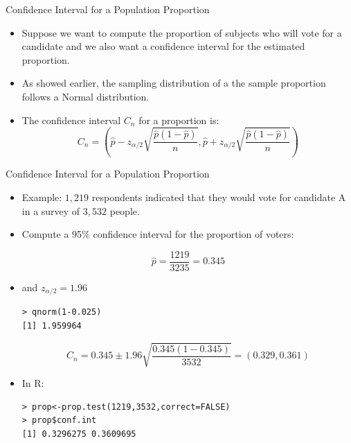 \documentclass[handout]{beamer}
\begin{document}
\begin{frame}{Confidence Interval for a Population Proportion}
\scriptsize{
\begin{itemize}
 \item Suppose we want to compute the proportion of subjects who will vote for a candidate and we also want a confidence interval for the estimated proportion.
 
 \item As showed earlier, the sampling distribution of a the sample proportion follows a Normal distribution.

 \item The confidence interval $C_n$ for a proportion is:
\begin{displaymath}
 C_n = \left(\hat{p}-z_{\alpha/2}\sqrt{\frac{\hat{p}(1-\hat p)}{n}} , \hat{p} + z_{\alpha/2}\sqrt{\frac{\hat{p}(1-\hat p)}{n}}\right) 
 \end{displaymath} 



\end{itemize}

}

 
\end{frame}


\begin{frame}[fragile]{Confidence Interval for a Population Proportion}
\scriptsize{
\begin{itemize}
\item Example: $1,219$ respondents indicated that they would vote for candidate A in a survey of $3,532$ people. 

\item Compute a 95\% confidence interval for the proportion of voters: 
 
\begin{displaymath}
 \hat{p}=\frac{1219}{3235}=0.345
\end{displaymath}

\item and $z_{\alpha/2}=1.96$ 
\begin{verbatim}
> qnorm(1-0.025)
[1] 1.959964
\end{verbatim}

\begin{displaymath}
 C_n = 0.345 \pm 1.96\sqrt{\frac{0.345(1-0.345)}{3532}} = (0.329,0.361)  
 \end{displaymath} 
 
\item In R:
 
\begin{verbatim}
> prop<-prop.test(1219,3532,correct=FALSE)
> prop$conf.int
[1] 0.3296275 0.3609695
\end{verbatim}



\end{itemize}

}

 
\end{frame}
\end{document}
